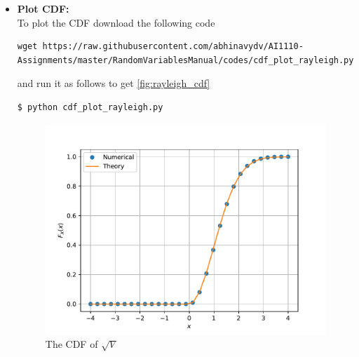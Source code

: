 \documentclass[journal,12pt,twocolumn]{IEEEtran}
\renewcommand\thesection{\arabic{section}}
\begin{document}
\begin{enumerate}[label=\thesection.\arabic*
        ,ref=\thesection.\theenumi]
\begin{itemize}
                    Compile and execute the program as follows to generate data for the distribution
                    \begin{lstlisting}
  $ gcc rayleigh_dat.c -lm -o rayleigh_dat
  $ ./rayleigh_dat
          \end{lstlisting}

              \item \textbf{Plot CDF:}\\
                    To plot the CDF download the following code
                    \begin{lstlisting}
wget https://raw.githubusercontent.com/abhinavydv/AI1110-Assignments/master/RandomVariablesManual/codes/cdf_plot_rayleigh.py
\end{lstlisting}
                    and run it as follows to get \autoref{fig:rayleigh_cdf}
                    \begin{lstlisting}
$ python cdf_plot_rayleigh.py
\end{lstlisting}
                    \begin{figure}
                        \centering
                        \includegraphics[width=\columnwidth]{./figs/rayleigh_cdf}
                        \caption{The CDF of $\sqrt{V}$}
                        \label{fig:rayleigh_cdf}
                    \end{figure}


\end{itemize}
\end{enumerate}
\end{document}
